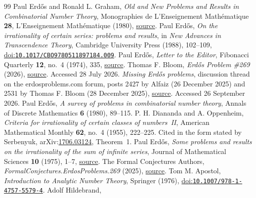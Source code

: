 \begin{thebibliography}{99}
 Paul Erd\H{o}s and Ronald L. Graham,
  \emph{Old and New Problems and Results in Combinatorial Number Theory}, Monographies de L'Enseignement Math\'{e}matique \textbf{28}, L'Enseignement Math\'{e}matique (1980),
  \href{https://mathweb.ucsd.edu/~ronspubs/80_11_number_theory.pdf}{source}.
 Paul Erd\H{o}s,
  \emph{On the irrationality of certain series: problems and results}, in \emph{New Advances in Transcendence Theory}, Cambridge University Press (1988), 102--109,
  \href{https://doi.org/10.1017/CBO9780511897184.009}{doi:\nolinkurl{10.1017/CBO9780511897184.009}}.
 Paul Erd\H{o}s,
  \emph{Letter to the Editor}, Fibonacci Quarterly \textbf{12}, no.~4 (1974), 335,
  \href{https://www.fq.math.ca/Scanned/12-4/letter.pdf}{source}.
 Thomas F. Bloom,
  \emph{Erd\H{o}s Problem \#269} (2026),
  \href{https://www.erdosproblems.com/269}{source}. Accessed 28 July 2026.
 \emph{Missing Erd\H{o}s problems},
  discussion thread on the erdosproblems.com forum, posts 2427 by Alfaiz
  (26 December 2025) and 2531 by Thomas F. Bloom (28 December 2025),
  \href{https://www.erdosproblems.com/forum/thread/Missing\%20Erd\%C5\%91s\%20problems}{source}.
  Accessed 26 September 2026.
 Paul Erd\H{o}s,
  \emph{A survey of problems in combinatorial number theory},
  Annals of Discrete Mathematics \textbf{6} (1980), 89--115.
 P. H. Diananda and A. Oppenheim,
  \emph{Criteria for irrationality of certain classes of numbers~II},
  American Mathematical Monthly \textbf{62}, no.~4 (1955), 222--225.
  Cited in the form stated by Serbenyuk, arXiv:\href{https://arxiv.org/abs/1706.03124}{1706.03124}, Theorem~1.
 Paul Erd\H{o}s,
  \emph{Some problems and results on the irrationality of the sum of infinite series},
  Journal of Mathematical Sciences \textbf{10} (1975), 1--7,
  \href{https://users.renyi.hu/~p_erdos/1976-44.pdf}{source}.
 The Formal Conjectures Authors,
  \emph{FormalConjectures.ErdosProblems.269} (2025),
  \href{https://github.com/google-deepmind/formal-conjectures/blob/f776d2f2039351b00737ffcafb9d7d7666e1d9af/FormalConjectures/ErdosProblems/269.lean}{source}.
 Tom M. Apostol,
  \emph{Introduction to Analytic Number Theory}, Springer (1976),
  \href{https://doi.org/10.1007/978-1-4757-5579-4}{doi:\nolinkurl{10.1007/978-1-4757-5579-4}}.
 Adolf Hildebrand,

\end{thebibliography}
